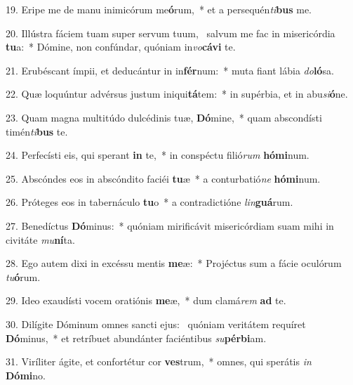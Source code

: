 19. Eripe me de manu inimicórum me\textbf{ó}rum,~*  et a persequén\textit{ti}\textbf{bus} me.\

20. Illústra fáciem tuam super servum tuum, \dag\  salvum me fac in misericórdia \textbf{tu}a:~*  Dómine, non confúndar, quóniam in\textit{vo}\textbf{cá}\textbf{vi} te.\

21. Erubéscant ímpii, et deducántur in in\textbf{fér}num:~*  muta fiant lábia \textit{do}\textbf{ló}sa.\

22. Quæ loquúntur advérsus justum iniqui\textbf{tá}tem:~*  in supérbia, et in abu\textit{si}\textbf{ó}ne.\

23. Quam magna multitúdo dulcédinis tuæ, \textbf{Dó}mine,~*  quam abscondísti timén\textit{ti}\textbf{bus} te.\

24. Perfecísti eis, qui sperant \textbf{in} te,~*  in conspéctu filió\textit{rum} \textbf{hó}\textbf{mi}num.\

25. Abscóndes eos in abscóndito faciéi \textbf{tu}æ~*  a conturbatió\textit{ne} \textbf{hó}\textbf{mi}num.\

26. Próteges eos in tabernáculo \textbf{tu}o~*  a contradictióne \textit{lin}\textbf{guá}rum.\

27. Benedíctus \textbf{Dó}minus:~*  quóniam mirificávit misericórdiam suam mihi in civitáte \textit{mu}\textbf{ní}ta.\

28. Ego autem dixi in excéssu mentis \textbf{me}æ:~*  Projéctus sum a fácie oculórum \textit{tu}\textbf{ó}rum.\

29. Ideo exaudísti vocem oratiónis \textbf{me}æ,~*  dum clamá\textit{rem} \textbf{ad} te.\

30. Dilígite Dóminum omnes sancti ejus: \dag\  quóniam veritátem requíret \textbf{Dó}minus,~*  et retríbuet abundánter faciéntibus \textit{su}\textbf{pér}\textbf{bi}am.\

31. Viríliter ágite, et confortétur cor \textbf{ves}trum,~*  omnes, qui sperátis \textit{in} \textbf{Dó}\textbf{mi}no.\

